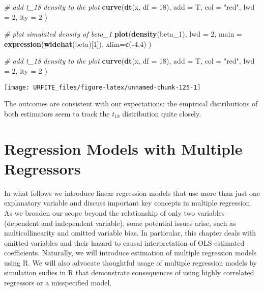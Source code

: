 \documentclass[]{book}
\newenvironment{Shaded}{\begin{snugshade}}{\end{snugshade}}
\newcommand{\KeywordTok}[1]{\textcolor[rgb]{0.13,0.29,0.53}{\textbf{#1}}}
\newcommand{\DataTypeTok}[1]{\textcolor[rgb]{0.13,0.29,0.53}{#1}}
\newcommand{\DecValTok}[1]{\textcolor[rgb]{0.00,0.00,0.81}{#1}}
\newcommand{\StringTok}[1]{\textcolor[rgb]{0.31,0.60,0.02}{#1}}
\newcommand{\CommentTok}[1]{\textcolor[rgb]{0.56,0.35,0.01}{\textit{#1}}}
\newcommand{\OperatorTok}[1]{\textcolor[rgb]{0.81,0.36,0.00}{\textbf{#1}}}
\newcommand{\NormalTok}[1]{#1}
\theoremstyle{definition}
\theoremstyle{definition}
\theoremstyle{definition}
\theoremstyle{remark}
\begin{document}
\begin{Shaded}
\begin{Highlighting}[]
\CommentTok{# add t_18 density to the plot}
\KeywordTok{curve}\NormalTok{(}\KeywordTok{dt}\NormalTok{(x, }\DataTypeTok{df =} \DecValTok{18}\NormalTok{), }
      \DataTypeTok{add =}\NormalTok{ T, }
      \DataTypeTok{col =} \StringTok{"red"}\NormalTok{, }
      \DataTypeTok{lwd =} \DecValTok{2}\NormalTok{, }
      \DataTypeTok{lty =} \DecValTok{2}
\NormalTok{      )}

\CommentTok{# plot simulated density of beta_1}
\KeywordTok{plot}\NormalTok{(}\KeywordTok{density}\NormalTok{(beta_}\DecValTok{1}\NormalTok{), }
     \DataTypeTok{lwd =} \DecValTok{2}\NormalTok{, }
     \DataTypeTok{main =} \KeywordTok{expression}\NormalTok{(}\KeywordTok{widehat}\NormalTok{(beta)[}\DecValTok{1}\NormalTok{]), }\DataTypeTok{xlim=}\KeywordTok{c}\NormalTok{(}\OperatorTok{-}\DecValTok{4}\NormalTok{,}\DecValTok{4}\NormalTok{)}
\NormalTok{     )}

\CommentTok{# add t_18 density to the plot}
\KeywordTok{curve}\NormalTok{(}\KeywordTok{dt}\NormalTok{(x, }\DataTypeTok{df =} \DecValTok{18}\NormalTok{), }
      \DataTypeTok{add =}\NormalTok{ T, }
      \DataTypeTok{col =} \StringTok{"red"}\NormalTok{, }
      \DataTypeTok{lwd =} \DecValTok{2}\NormalTok{, }
      \DataTypeTok{lty =} \DecValTok{2}
\NormalTok{      ) }
\end{Highlighting}
\end{Shaded}

\begin{center}\texttt{[image: URFITE\_files/figure-latex/unnamed-chunk-125-1]} \end{center}

The outcomes are consistent with our expectations: the empirical
distributions of both estimators seem to track the \(t_{18}\)
distribution quite closely.

\chapter{Regression Models with Multiple
Regressors}\label{regression-models-with-multiple-regressors}

In what follows we introduce linear regression models that use more than
just one explanatory variable and discuss important key concepts in
multiple regression. As we broaden our scope beyond the relationship of
only two variables (dependent and independent variable), some potential
issues arise, such as multicollinearity and omitted variable bias. In
particular, this chapter deals with omitted variables and their hazard
to causal interpretation of OLS-estimated coefficients. Naturally, we
will introduce estimation of multiple regression models using R. We will
also advocate thoughtful usage of multiple regression models by
simulation sudies in R that demonstrate consequences of using highly
correlated regressors or a misspecified model.
\end{document}
